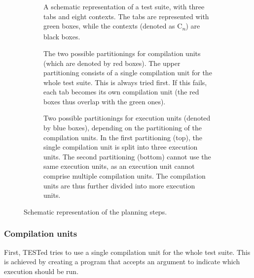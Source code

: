 \documentclass[../main]{subfiles}
\begin{document}
\begin{figure}
    \begin{subfigure}{\textwidth}
        \centering
        
        \caption{
            A schematic representation of a test suite, with three tabs and eight contexts.
            The tabs are represented with green boxes, while the contexts (denoted as C\textsubscript{$n$}) are black boxes.
        }
        \label{fig:planning-suite}
    \end{subfigure}
    \par\bigskip
    \begin{subfigure}{\textwidth}
        \centering
        
        \caption{
            The two possible partitionings for compilation units (which are denoted by red boxes).
            The upper partitioning consists of a single compilation unit for the whole test suite.
            This is always tried first.
            If this fails, each tab becomes its own compilation unit (the red boxes thus overlap with the green ones).
        }
        \label{fig:planning-compilation}
    \end{subfigure}
    \par\bigskip
    \begin{subfigure}{\textwidth}
        \centering
        
        \caption{
            Two possible partitionings for execution units (denoted by blue boxes), depending on the partitioning of the compilation units.
            In the first partitioning (top), the single compilation unit is split into three execution units.
            The second partitioning (bottom) cannot use the same execution units, as an execution unit cannot comprise multiple compilation units.
            The compilation units are thus further divided into more execution units.
        }
        \label{fig:planning-execution}
    \end{subfigure}
    \caption{Schematic representation of the planning steps.}
\end{figure}

\subsubsection{Compilation units}
\label{subsubsec:compilation-units}

First, TESTed tries to use a single compilation unit for the whole test suite.
This is achieved by creating a program that accepts an argument to indicate which execution should be run.
\end{document}

